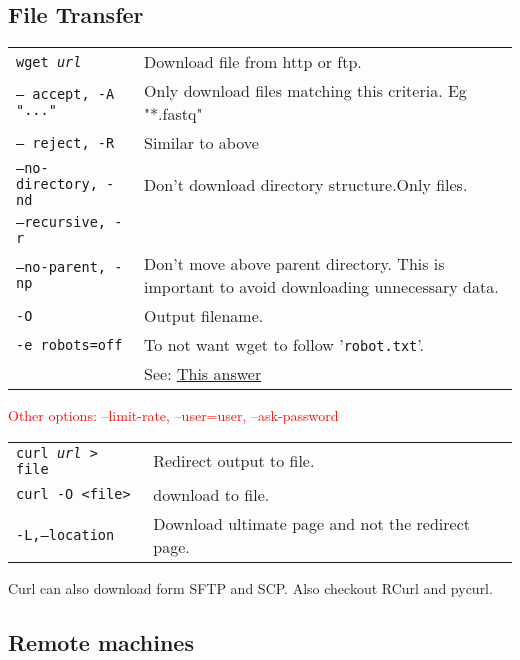 \vfill\null
\columnbreak


\subsection{File Transfer}

\begin{tabularx}{\linewidth}{lX}
\hline
\texttt{wget \textit{url}} & Download file from http or ftp.\\
\texttt{-- accept, -A "..."} & Only download files matching this criteria. Eg "*.fastq"\\
\texttt{-- reject, -R} & Similar to above\\
\texttt{--no-directory, -nd} & Don't download directory structure.Only files.\\
\texttt{--recursive, -r} & \\
\texttt{--no-parent, -np} & Don't move above parent directory. This is important to avoid downloading unnecessary data.\\
\texttt{-O} & Output filename.\\
\texttt{-e robots=off} & To not want wget to follow '\texttt{robot.txt}'.\\
& See: \href{https://stackoverflow.com/a/11124664}{This answer} \\
\hline
\end{tabularx}

\textcolor{red}{Other options: --limit-rate, --user=user, --ask-password}\\


\begin{tabularx}{\linewidth}{lX}
\hline
\texttt{curl \textit{url} > file} & Redirect output to file.\\
\texttt{curl -O <file>} & download to file.\\
\texttt{-L,--location} & Download ultimate page and not the redirect page.\\
\hline
\end{tabularx}
Curl can also download form SFTP and SCP. Also checkout RCurl and pycurl.


\vfill \null
\columnbreak

\subsection{Remote machines}

